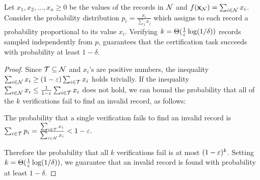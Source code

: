 \begin{lemma}\label{lem:sumV}
Let $x_1, x_2, \dots, x_n \ge 0$ be the values of the records in $\mathcal{N}$ and $f(\mathbf{x}_{\mathcal{N}}) = \sum_{i \in \mathcal{N}} x_i$. Consider 
the probability distribution $p_i = \frac {x_i} {\sum_j x_j}$ which assigns to each record a probability proportional to its 
value $x_i$. Verifying $k=\Theta(\frac{1}{\varepsilon}\log (1/\delta))$ records sampled independently from $p$, guarantees that the 
certification task succeeds with probability at least $1 - \delta$.
\end{lemma}

\begin{proof}
  Since $\mathcal{T}\subseteq \mathcal{N}$ and $x_i$'s are positive numbers, the inequality 
$\sum_{i \in \mathcal{N}} x_i \ge (1-\varepsilon) \sum_{i \in \mathcal{T}} x_i$ holds trivially. If the inequality 
$\sum_{i \in \mathcal{N}} x_i \le \frac 1 {1-\varepsilon} \sum_{i \in \mathcal{T}} x_i$ does not hold, we can bound the probability that all 
of the $k$ verifications fail to find an invalid record, as follows:

The probability that a single verification fails to find an invalid record is 
$\sum_{i \in \mathcal{T}} p_i = \frac {\sum_{i \in \mathcal{T}} x_i} {\sum_{i \in \mathcal{N}} x_i} < 1 - \varepsilon.$

Therefore the probability that all $k$ verifications fail is at most $(1-\varepsilon)^k$. Setting 
$k = \Theta(\frac{1}{\varepsilon}\log (1/\delta))$, we guarantee that an invalid record is found with probability at least $1-\delta$.
\end{proof}


